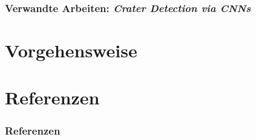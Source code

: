 \documentclass[9pt]{beamer}
\newenvironment{myframe}[1][]{%
	\begin{frame}%
		\frametitle{#1}
		\setcounter{footnote}{0}
		
		
	}{%
	\end{frame}%
}
\begin{document}
\begin{myframe}[Verwandte Arbeiten: \textit{Crater Detection via CNNs}\cite{2016arXiv160100978C}]
	
\end{myframe}

\section{Vorgehensweise}

\section{Referenzen}

\begin{myframe}[Referenzen]
	
	
\end{myframe}

	
\end{document}
